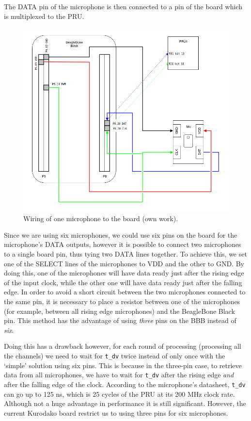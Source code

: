 \documentclass[]{report}
\begin{document}
The DATA pin of the microphone is then connected to a pin of the board which is multiplexed to the PRU.

\begin{figure}[!b]
\centering
\includegraphics[width=0.6\linewidth]{Pictures/wiring.png}
\caption{Wiring of one microphone to the board (own work).}
\end{figure}

Since we are using six microphones, we could use six pins on the board for the microphone's DATA outputs, however it is possible to connect two microphones to a single board pin, thus tying two DATA lines together. To achieve this, we set one of the SELECT lines of the microphones to VDD and the other to GND. By doing this, one of the microphones will have data ready just after the rising edge of the input clock, while the other one will have data ready just after the falling edge. In order to avoid a short circuit between the two microphones connected to the same pin, it is necessary to place a resistor between one of the microphones (for example, between all rising edge microphones) and the BeagleBone Black pin. This method has the advantage of using \emph{three} pins on the BBB instead of \emph{six}.

Doing this has a drawback however, for each round of processing (processing all the channels) we need to wait for \texttt{t\_dv} twice instead of only once with the `simple' solution using six pins. This is because in the three-pin case, to retrieve data from all microphones, we have to wait for \texttt{t\_dv} after the rising edge \emph{and} after the falling edge of the clock. According to the microphone's datasheet, \texttt{t\_dv} can go up to 125 ns, which is 25 cycles of the PRU at its 200 MHz clock rate. Although not a huge advantage in performance it is still significant. However, the current Kurodako board restrict us to using three pins for six microphones.
\end{document}
